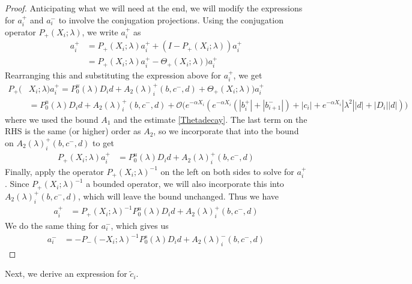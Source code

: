 \documentclass[thesis.tex]{subfiles}
\begin{document}
\begin{lemma}
\begin{proof}
Anticipating what we will need at the end, we will modify the expressions for $a_i^+$ and $a_i^-$ to involve the conjugation projections. Using the conjugation operator $P_+(X_i; \lambda)$, we write $a_i^+$ as
\begin{align*}
a_i^+ &= P_+(X_i; \lambda)a_i^+ + (I - P_+(X_i; \lambda))a_i^+ \\
&= P_+(X_i; \lambda)a_i^+ - \Theta_+(X_i; \lambda))a_i^+
\end{align*}
Rearranging this and substituting the expression above for $a_i^+$, we get
\begin{align*}
P_+(&X_i; \lambda) a_i^+ = P_0^u(\lambda) D_i d + A_2(\lambda)_i^+(b, c^-, d) + \Theta_+(X_i; \lambda))a_i^+ \\
&= P_0^u(\lambda) D_i d + A_2(\lambda)_i^+(b, c^-, d) + \mathcal{O}\Big( e^{-\alpha X_i} ( e^{-\alpha X_i} (|b_i^+| + |b_{i+1}^-|) + |c_i| + e^{-\alpha X_i} |\lambda^2||d| + |D_i||d| )\Big)
\end{align*}
where we used the bound $A_1$ and the estimate \eqref{Thetadecay}. The last term on the RHS is the same (or higher) order as $A_2$, so we incorporate that into the bound on $A_2(\lambda)_i^+(b, c^-, d)$ to get
\begin{align*}
P_+(X_i; \lambda)a_i^+ &= P_0^u(\lambda) D_i d + A_2(\lambda)_i^+(b, c^-, d)
\end{align*}
Finally, apply the operator $P_+(X_i; \lambda)^{-1}$ on the left on both sides to solve for $a_i^+$. Since $P_+(X_i; \lambda)^{-1}$ a bounded operator, we will also incorporate this into $A_2(\lambda)_i^+(b, c^-, d)$, which will leave the bound unchanged. Thus we have
\begin{align*}
a_i^+ &= P_+(X_i; \lambda)^{-1} P_0^u(\lambda) D_i d + A_2(\lambda)_i^+(b, c^-, d)
\end{align*}
We do the same thing for $a_i^-$, which gives us
\begin{align*}
a_i^- &= -P_-(-X_i; \lambda)^{-1} P_0^s(\lambda) D_i d + A_2(\lambda)_i^-(b, c^-, d)
\end{align*}
\end{proof}
\end{lemma}

Next, we derive an expression for $\tilde{c}_i$.
\end{document}
